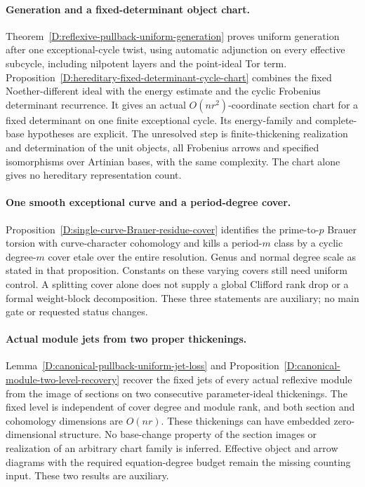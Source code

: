 \paragraph{Generation and a fixed-determinant object chart.}
Theorem~\ref{D:reflexive-pullback-uniform-generation} proves
uniform generation after one exceptional-cycle twist, using
automatic adjunction on every effective subcycle, including
nilpotent layers and the point-ideal Tor term.
Proposition~\ref{D:hereditary-fixed-determinant-cycle-chart}
combines the fixed Noether-different ideal with the energy
estimate and the cyclic Frobenius determinant recurrence.
It gives an actual $O(nr^2)$-coordinate section chart for a fixed
determinant on one finite exceptional cycle. Its energy-family
and complete-base hypotheses are explicit. The unresolved step
is finite-thickening realization and determination of the unit
objects, all Frobenius arrows and specified isomorphisms over
Artinian bases, with the same complexity. The chart alone
gives no hereditary representation count.

\paragraph{One smooth exceptional curve and a period-degree cover.}
Proposition~\ref{D:single-curve-Brauer-residue-cover} identifies
the prime-to-$p$ Brauer torsion with curve-character cohomology
and kills a period-$m$ class by a cyclic degree-$m$ cover
etale over the entire resolution. Genus and normal degree
scale as stated in that proposition. Constants on these
varying covers still need uniform control. A splitting cover
alone does not supply a global Clifford rank drop or a
formal weight-block decomposition. These three statements
are auxiliary; no main gate or requested status changes.


\paragraph{Actual module jets from two proper thickenings.}
Lemma~\ref{D:canonical-pullback-uniform-jet-loss} and
Proposition~\ref{D:canonical-module-two-level-recovery}
recover the fixed jets of every actual reflexive module from the
image of sections on two consecutive parameter-ideal thickenings.
The fixed level is independent of cover degree and module rank,
and both section and cohomology dimensions are $O(nr)$.
These thickenings can have embedded zero-dimensional structure.
No base-change property of the section images or realization
of an arbitrary chart family is inferred. Effective object and
arrow diagrams with the required equation-degree budget remain
the missing counting input. These two results are auxiliary.


